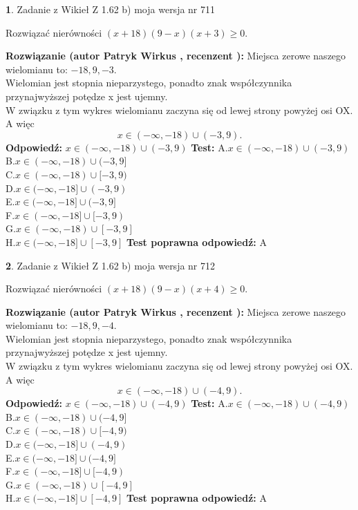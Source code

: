 \documentclass[12pt, a4paper]{article}
\theoremstyle{definition} %
\newtheorem{zad}{}
\newcommand{\zadStart}[1]{\begin{zad}#1\newline}
\newcommand{\zadStop}{\end{zad}}
\newcommand{\rozwStart}[2]{\noindent \textbf{Rozwiązanie (autor #1 , recenzent #2): }\newline}
\newcommand{\rozwStop}{\newline}
\newcommand{\odpStart}{\noindent \textbf{Odpowiedź:}\newline}
\newcommand{\odpStop}{\newline}
\newcommand{\testStart}{\noindent \textbf{Test:}\newline}
\newcommand{\testStop}{\newline}
\newcommand{\kluczStart}{\noindent \textbf{Test poprawna odpowiedź:}\newline}
\newcommand{\kluczStop}{\newline}
\begin{document}
\zadStart{Zadanie z Wikieł Z 1.62 b) moja wersja nr 711}

Rozwiązać nierówności $(x+18)(9-x)(x+3)\ge0$.
\zadStop
\rozwStart{Patryk Wirkus}{}
Miejsca zerowe naszego wielomianu to: $-18, 9, -3$.\\
Wielomian jest stopnia nieparzystego, ponadto znak współczynnika przy\linebreak najwyższej potędze x jest ujemny.\\ W związku z tym wykres wielomianu zaczyna się od lewej strony powyżej osi OX. A więc $$x \in (-\infty,-18) \cup (-3,9).$$
\rozwStop
\odpStart
$x \in (-\infty,-18) \cup (-3,9)$
\odpStop
\testStart
A.$x \in (-\infty,-18) \cup (-3,9)$\\
B.$x \in (-\infty,-18) \cup (-3,9]$\\
C.$x \in (-\infty,-18) \cup [-3,9)$\\
D.$x \in (-\infty,-18] \cup (-3,9)$\\
E.$x \in (-\infty,-18] \cup (-3,9]$\\
F.$x \in (-\infty,-18] \cup [-3,9)$\\
G.$x \in (-\infty,-18) \cup [-3,9]$\\
H.$x \in (-\infty,-18] \cup [-3,9]$
\testStop
\kluczStart
A
\kluczStop



\zadStart{Zadanie z Wikieł Z 1.62 b) moja wersja nr 712}

Rozwiązać nierówności $(x+18)(9-x)(x+4)\ge0$.
\zadStop
\rozwStart{Patryk Wirkus}{}
Miejsca zerowe naszego wielomianu to: $-18, 9, -4$.\\
Wielomian jest stopnia nieparzystego, ponadto znak współczynnika przy\linebreak najwyższej potędze x jest ujemny.\\ W związku z tym wykres wielomianu zaczyna się od lewej strony powyżej osi OX. A więc $$x \in (-\infty,-18) \cup (-4,9).$$
\rozwStop
\odpStart
$x \in (-\infty,-18) \cup (-4,9)$
\odpStop
\testStart
A.$x \in (-\infty,-18) \cup (-4,9)$\\
B.$x \in (-\infty,-18) \cup (-4,9]$\\
C.$x \in (-\infty,-18) \cup [-4,9)$\\
D.$x \in (-\infty,-18] \cup (-4,9)$\\
E.$x \in (-\infty,-18] \cup (-4,9]$\\
F.$x \in (-\infty,-18] \cup [-4,9)$\\
G.$x \in (-\infty,-18) \cup [-4,9]$\\
H.$x \in (-\infty,-18] \cup [-4,9]$
\testStop
\kluczStart
A
\kluczStop
\end{document}
